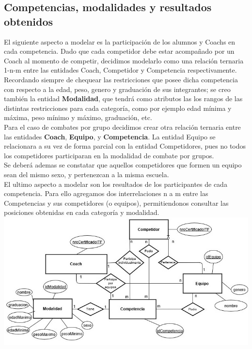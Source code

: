 \newpage
\subsection{Competencias, modalidades y resultados obtenidos}

El siguiente aspecto a modelar es la participación de los alumnos y Coachs en cada competencia. Dado que cada competidor debe estar acompañado por un Coach al momento de competir, decidimos modelarlo como una relación ternaria 1-n-m entre las entidades Coach, Competidor y Competencia respectivamente. Recordando siempre de chequear las restricciones que posee dicha competencia con respecto a la edad, peso, genero y graduación de sus integrantes; se creo también la entidad \textbf{Modalidad}, que tendrá como atributos las los rangos de las distintas restricciones para cada categoría, como por ejemplo edad mínima y máxima, peso mínimo y máximo, graduación, etc.\\

Para el caso de combates por grupo decidimos crear otra relación ternaria entre las entidades \textbf{Coach}, \textbf{Equipo}, y \textbf{Competencia}. La entidad Equipo se relacionara a su vez de forma parcial con la entidad Competidores, pues no todos los competidores participaran en la modalidad de combate por grupos. \\

Se deberá ademas se constatar que aquellos competidores que formen un equipo sean del mismo sexo, y pertenezcan a la misma escuela.\\

El ultimo aspecto a modelar son los resultados de los participantes de cada competencia. Para ello agregamos dos interrelaciones n a m entre las Competencias y sus competidores (o equipos), permitiendonos consultar las posiciones obtenidas en cada categoría y modalidad.\\

\includegraphics[scale=0.75]{competenciaDiag.jpg}


